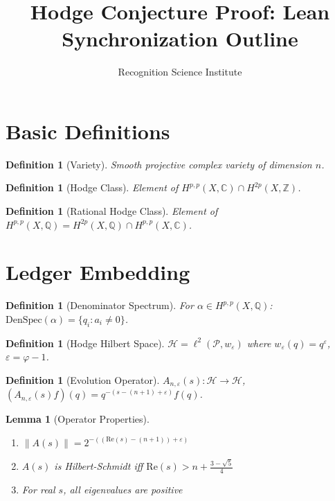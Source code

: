 \documentclass[12pt]{article}
\title{Hodge Conjecture Proof: Lean Synchronization Outline}
\author{Recognition Science Institute}
\newtheorem{lemma}[theorem]{Lemma}
\newtheorem{definition}[theorem]{Definition}
\begin{document}
\maketitle

\section{Basic Definitions}
\begin{definition}[Variety]
Smooth projective complex variety of dimension $n$.
\end{definition}

\begin{definition}[Hodge Class]
Element of $H^{p,p}(X,\mathbb{C}) \cap H^{2p}(X,\mathbb{Z})$.
\end{definition}

\begin{definition}[Rational Hodge Class]
Element of $H^{p,p}(X,\mathbb{Q}) = H^{2p}(X,\mathbb{Q}) \cap H^{p,p}(X,\mathbb{C})$.
\end{definition}

\section{Ledger Embedding}

\begin{definition}[Denominator Spectrum]
For $\alpha \in H^{p,p}(X,\mathbb{Q})$: $\text{DenSpec}(\alpha) = \{q_i : a_i \neq 0\}$.
\end{definition}

\begin{definition}[Hodge Hilbert Space]
$\mathcal{H} = \ell^2(\mathcal{P}, w_\varepsilon)$ where $w_\varepsilon(q) = q^\varepsilon$, $\varepsilon = \varphi - 1$.
\end{definition}

\begin{definition}[Evolution Operator]
$A_{n,\varepsilon}(s): \mathcal{H} \to \mathcal{H}$, $(A_{n,\varepsilon}(s) f)(q) = q^{-(s-(n+1)+\varepsilon)} f(q)$.
\end{definition}

\begin{lemma}[Operator Properties]
\begin{enumerate}
\item $\|A(s)\| = 2^{-((\text{Re}(s)-(n+1))+\varepsilon)}$
\item $A(s)$ is Hilbert-Schmidt iff $\text{Re}(s) > n + \frac{3-\sqrt{5}}{4}$
\item For real $s$, all eigenvalues are positive
\end{enumerate}
\end{lemma}
\end{document}
